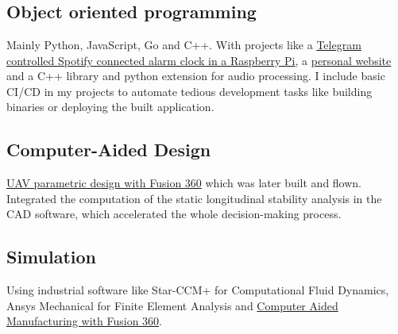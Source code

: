  \section*{\faWrench} \label{sec:skills}

\subsection{Object oriented programming}
Mainly Python, JavaScript, Go and C++. With projects like a
\href{https://github.com/esdandreu/WakePi}{Telegram controlled Spotify
connected alarm clock in a Raspberry Pi}, a
\href{https://github.com/esdandreu/esdandreu.github.io}{personal website}
and a C++ library and python extension for audio processing. I include basic
CI/CD in my projects to automate tedious development tasks like
building binaries or deploying the built application.

\subsection{Computer-Aided Design}
\href{https://1drv.ms/b/s!AqZvnCxLmXx9hL9DSw-Ee4zU6H5Rcw?e=8hDatB}{UAV
    parametric design with Fusion 360} which was later built and flown. Integrated
the computation of the static longitudinal stability analysis in the CAD
software, which accelerated the whole decision-making process.

\subsection{Simulation}
Using industrial software like Star-CCM+ for Computational Fluid Dynamics, Ansys
Mechanical for Finite Element Analysis and
\href{https://upvedues-my.sharepoint.com/:v:/g/personal/angibo2_upv_edu_es/EdjN2F7wqulLhB52aju3Q_cBvuYI8B9KSRrEgAU7Ta_I_g?e=SFogxW}{Computer
Aided Manufacturing with Fusion 360}. 